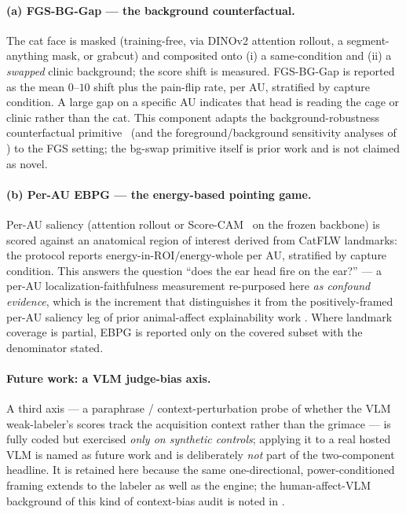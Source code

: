 \paragraph{(a) FGS-BG-Gap --- the background counterfactual.} The cat face is
masked (training-free, via DINOv2 attention rollout, a segment-anything mask, or
grabcut) and composited onto (i) a same-condition and (ii) a \emph{swapped}
clinic background; the score shift is measured. FGS-BG-Gap is reported as the
mean $0$--$10$ shift plus the pain-flip rate, per AU, stratified by capture
condition. A large gap on a specific AU indicates that head is reading the
cage or clinic rather than the cat. This component adapts the
background-robustness counterfactual primitive~\cite{xiao2021noise} (and the
foreground/background sensitivity analyses of \citealp{moayeri2022comprehensive})
to the FGS setting; the bg-swap primitive itself is prior work and is not claimed
as novel.

\paragraph{(b) Per-AU EBPG --- the energy-based pointing game.} Per-AU saliency
(attention rollout or Score-CAM~\cite{wang2020scorecam} on the frozen backbone)
is scored against an anatomical region of interest derived from CatFLW
landmarks: the protocol reports $\text{energy-in-ROI} / \text{energy-whole}$ per
AU, stratified by capture condition. This answers the question ``does the ear
head fire on the ear?'' --- a per-AU localization-faithfulness measurement
re-purposed here \emph{as confound evidence}, which is the increment that
distinguishes it from the positively-framed per-AU saliency leg of prior
animal-affect explainability work \cite{lencioni2025segment}. Where landmark
coverage is partial, EBPG is reported only on the covered subset with the
denominator stated.

\paragraph{Future work: a VLM judge-bias axis.} A third axis --- a paraphrase /
context-perturbation probe of whether the VLM weak-labeler's scores track the
acquisition context rather than the grimace --- is fully coded but exercised
\emph{only on synthetic controls}; applying it to a real hosted VLM is named as
future work and is deliberately \emph{not} part of the two-component headline.
It is retained here because the same one-directional, power-conditioned framing
extends to the labeler as well as the engine; the human-affect-VLM background of
this kind of context-bias audit is noted in \cite{context2025becki}.

